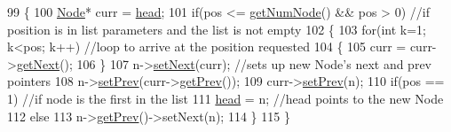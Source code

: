 \begin{DoxyCode}
99 \{
100    \hyperlink{classNode}{Node}* curr = \hyperlink{classLinkedList_a35e09287e2d2943707b011208e7a8ed2}{head};
101    \textcolor{keywordflow}{if}(pos <= \hyperlink{classLinkedList_ae04dbbcae32f8fb03dce3e174854981f}{getNumNode}() && pos > 0) \textcolor{comment}{//if position is in list parameters and the list is not
       empty                                                                                                         }
102    \{
103       \textcolor{keywordflow}{for}(\textcolor{keywordtype}{int} k=1; k<pos; k++) \textcolor{comment}{//loop to arrive at the position requested                                  
                                                                                                       }
104       \{
105          curr = curr->\hyperlink{classNode_af8f2d178f274dd254e6e1965971f0fd0}{getNext}();
106       \}
107       n->\hyperlink{classNode_a0f69ba4f73cd616755f4ec0ae9fa7f96}{setNext}(curr); \textcolor{comment}{//sets up new Node's next and prev pointers                                 
                                                                                                              }
108       n->\hyperlink{classNode_a3c292611bdab2cbe724c841c6984fcad}{setPrev}(curr->\hyperlink{classNode_af4e96a27c770adc291f2f7a4bc2c538d}{getPrev}());
109       curr->\hyperlink{classNode_a3c292611bdab2cbe724c841c6984fcad}{setPrev}(n);
110       \textcolor{keywordflow}{if}(pos == 1) \textcolor{comment}{//if node is the first in the list                                                      
                                                                                                       }
111          \hyperlink{classLinkedList_a35e09287e2d2943707b011208e7a8ed2}{head} = n; \textcolor{comment}{//head points to the new Node                                                       
                                                                                                           }
112       \textcolor{keywordflow}{else}
113          n->\hyperlink{classNode_af4e96a27c770adc291f2f7a4bc2c538d}{getPrev}()->setNext(n);
114    \}
115 \}
\end{DoxyCode}


